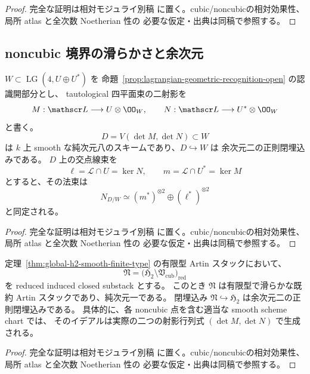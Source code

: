 \begin{proof}
完全な証明は相対モジュライ別稿
\cite[内在的モジュライの有限型代数性・滑らかさ・境界]{QuadricModuli2026}
に置く。cubic/noncubicの相対効果性、局所 atlas と全次数 Noetherian 性の
必要な仮定・出典は同稿で参照する。
\end{proof}

\subsection{noncubic 境界の滑らかさと余次元}

\begin{lemma}[二つの射影行列式の横断性]
\label{lem:lagrangian-boundary-transverse}
$W\subset\operatorname{LG}(4,U\oplus U^*)$ を
命題~\ref{prop:lagrangian-geometric-recognition-open} の認識開部分とし、
tautological 四平面束の二射影を
\[
 M:\mathscr L\longrightarrow U\otimes\OO_W,
 \qquad N:\mathscr L\longrightarrow U^*\otimes\OO_W
\]
と書く。
\[
 D=V(\det M,\det N)\subset W
\]
は $k$ 上 smooth な純次元八のスキームであり、$D\hookrightarrow W$ は
余次元二の正則閉埋込みである。
$D$ 上の交点線束を
\[
 \ell=\mathscr L\cap U=\ker N,\qquad
 m=\mathscr L\cap U^*=\ker M
\]
とすると、その法束は
\[
 N_{D/W}\simeq(m^*)^{\otimes2}\oplus(\ell^*)^{\otimes2}
 \tag{NC-boundary-normal}\label{eq:noncubic-boundary-normal}
\]
と同定される。
\end{lemma}

\begin{proof}
完全な証明は相対モジュライ別稿
\cite[内在的モジュライの有限型代数性・滑らかさ・境界]{QuadricModuli2026}
に置く。cubic/noncubicの相対効果性、局所 atlas と全次数 Noetherian 性の
必要な仮定・出典は同稿で参照する。
\end{proof}

\begin{theorem}
\label{thm:noncubic-boundary-smooth-codim-two}
定理~\ref{thm:global-h2-smooth-finite-type} の有限型 Artin スタックにおいて、
\[
 \mathfrak N=
 \bigl(\mathfrak H_2\setminus\mathfrak V_{\mathrm{cub}}\bigr)_{\mathrm{red}}
\]
を reduced induced closed substack とする。
このとき $\mathfrak N$ は有限型で滑らかな既約 Artin スタックであり、純次元一である。
閉埋込み $\mathfrak N\hookrightarrow\mathfrak H_2$ は余次元二の正則閉埋込みである。
具体的に、各 noncubic 点を含む適当な smooth scheme chart では、
そのイデアルは実際の二つの射影行列式 $(\det M,\det N)$ で生成される。
\end{theorem}

\begin{proof}
完全な証明は相対モジュライ別稿
\cite[内在的モジュライの有限型代数性・滑らかさ・境界]{QuadricModuli2026}
に置く。cubic/noncubicの相対効果性、局所 atlas と全次数 Noetherian 性の
必要な仮定・出典は同稿で参照する。
\end{proof}

